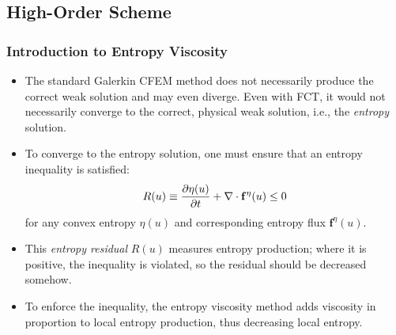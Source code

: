 \documentclass{beamer} \useoutertheme{infolines}
\begin{document}
\subsection{High-Order Scheme}
\begin{frame}
\frametitle{Introduction to Entropy Viscosity}

\begin{itemize}
   \item The standard Galerkin CFEM method does not necessarily produce the
      correct weak solution and may even diverge. Even with
      FCT, it would not necessarily converge to the correct, physical
      weak solution, i.e., the \emph{entropy} solution.
   \item To converge to the entropy solution, one must ensure that an entropy
      inequality is satisfied:
      \begin{equation}
         R(u) \equiv \frac{\partial \eta(u)}{\partial t} + \nabla\cdot\mathbf{f}^\eta(u) \leq 0
      \end{equation}
      for any convex entropy $\eta(u)$ and corresponding entropy flux
      $\mathbf{f}^\eta(u)$.
   \item This \emph{entropy residual} $R(u)$ measures entropy production;
      where it is positive, the inequality is violated, so the residual
      should be decreased somehow.
   \item To enforce the inequality, the entropy viscosity method adds
      viscosity in proportion to local entropy production, thus decreasing
      local entropy.
\end{itemize}

\end{frame}
\end{document}
